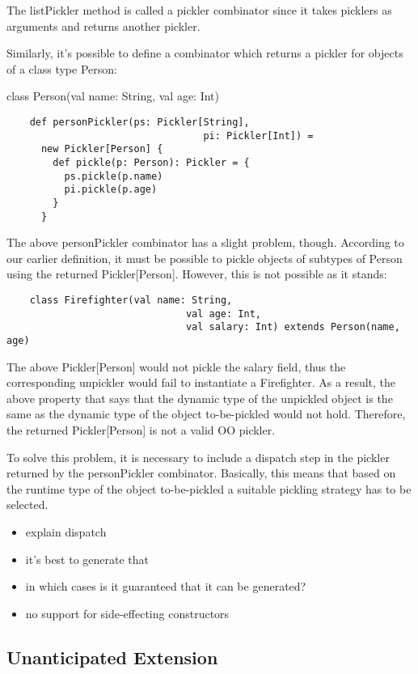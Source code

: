 \documentclass[preprint,10pt]{sigplanconf}
\theoremstyle{definition}
\begin{document}
The listPickler method is called a pickler combinator since it takes picklers as arguments and returns another pickler.

Similarly, it's possible to define a combinator which returns a pickler for objects of a class type Person:

    class Person(val name: String, val age: Int)

\begin{verbatim}
    def personPickler(ps: Pickler[String],
                                  pi: Pickler[Int]) =
      new Pickler[Person] {
        def pickle(p: Person): Pickler = {
          ps.pickle(p.name)
          pi.pickle(p.age)
        }
      }
\end{verbatim}

The above personPickler combinator has a slight problem, though. According to our earlier definition, it must be possible to pickle objects of subtypes of Person using the returned Pickler[Person]. However, this is not possible as it stands:

\begin{verbatim}
    class Firefighter(val name: String,
                               val age: Int,
                               val salary: Int) extends Person(name, age)
\end{verbatim}

The above Pickler[Person] would not pickle the salary field, thus the corresponding unpickler would fail to instantiate a Firefighter. As a result, the above property that says that the dynamic type of the unpickled object is the same as the dynamic type of the object to-be-pickled would not hold. Therefore, the returned Pickler[Person] is not a valid OO pickler.

To solve this problem, it is necessary to include a dispatch step in the pickler returned by the personPickler combinator. Basically, this means that based on the runtime type of the object to-be-pickled a suitable pickling strategy has to be selected.

\begin{itemize}
  \item explain dispatch
  \item it's best to generate that
  \item in which cases is it guaranteed that it can be generated?
    \item no support for side-effecting constructors
\end{itemize}

\subsection{Unanticipated Extension}
\end{document}
